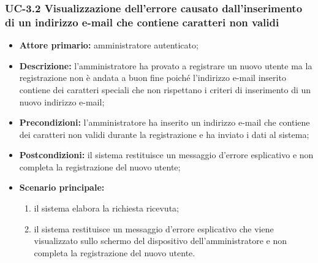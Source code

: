 \subsubsection{UC-3.2 Visualizzazione dell'errore causato dall'inserimento di un indirizzo e-mail che contiene caratteri non validi}
\begin{itemize}
	\item \textbf{Attore primario:} amministratore autenticato;

	\item \textbf{Descrizione:} l'amministratore ha provato a registrare un nuovo utente ma la registrazione non è andata a buon fine poiché l'indirizzo e-mail inserito contiene dei caratteri speciali che non rispettano i criteri di inserimento di un nuovo indirizzo e-mail;

	\item \textbf{Precondizioni:} l'amministratore ha inserito un indirizzo e-mail che contiene dei caratteri non validi durante la registrazione e ha inviato i dati al sistema;

	\item \textbf{Postcondizioni:} il sistema restituisce un messaggio d'errore esplicativo e non completa la registrazione del nuovo utente;

	\item \textbf{Scenario principale:}
	\begin{enumerate}
   		 \item il sistema elabora la richiesta ricevuta;
   		 \item il sistema restituisce un messaggio d'errore esplicativo che viene visualizzato sullo schermo del dispositivo dell'amministratore e non completa la registrazione del nuovo utente.
	\end{enumerate}
\end{itemize}

